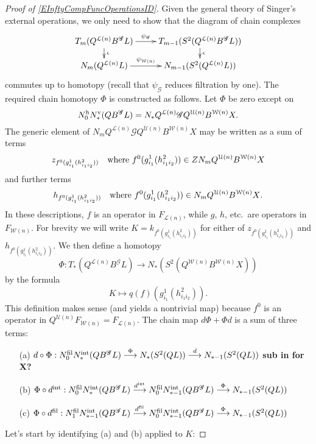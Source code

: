\documentclass[11pt]{amsart}
\theoremstyle{plain}
\theoremstyle{definition}
\renewcommand{\to}{\longrightarrow}
\newcommand{\squishlist}{
  \setlength{\itemsep}{.5pt}
  \setlength{\parskip}{0pt}
  \setlength{\parsep}{0pt}}
\newcommand{\scrG}{\mathscr{G}}
\newcommand{\calW}{\mathcal{W}}
\newcommand{\calU}{\mathcal{U}}
\newcommand{\calL}{\mathcal{L}}
\theoremstyle{plain}
\newcommand{\BSW}{{\scrG}}
\newcommand{\BSWres}{B^\BSW}%
\begin{document}
\begin{Composite functor spectral sequences}
\begin{tricky proofs of operation compatibilities}
\begin{proof}[Proof of \ref{EInftyCompFuncOperationsID}]
Given the general theory of Singer's external operations, we only need to show that the diagram of chain complexes
\[\xymatrix@R=4mm{
T_{m}(Q^{\calL(n)}\BSWres L)
\ar[r]^-{\psi_{\BSW}}
\ar[d]^-{\epsilon}
&%
T_{m-1}(S^2(Q^{\calL(n)}\BSWres L))\ar[d]^-{\epsilon}
\\%
N_{m}(Q^{\calL(n)}L)
\ar[r]^-{\psi_{\calW(n)}}
&%
N_{m-1}(S^2(Q^{\calL(n)} L))
}\]
commutes up to homotopy (recall that $\psi_{\BSW}$ reduces filtration by one). The required chain homotopy $\Phi$ is constructed as follows. Let $\Phi$ be zero except on 
\[N_0^\textup{h}N_*^\textup{v}(Q\BSWres L)=N_*Q^{\calL(n)}\BSW Q^{\calU(n)}B^{\calW(n)}X.\]
The generic element of $N_mQ^{\calL(n)}\BSW Q^{\calU(n)}B^{\calW(n)}X$ may be written as a sum of terms
\[z_{f^0(g^1_{i_1}(h^2_{i_1i_2}))}\textup{\quad where $f^0(g^1_{i_1}(h^2_{i_1i_2}))\in ZN_m Q^{\calU(n)}B^{\calW(n)}X$}\]
and further terms
\[h_{f^0(g^1_{i_1}(h^2_{i_1i_2}))}\textup{\quad where $f^0(g^1_{i_1}(h^2_{i_1i_2}))\in N_{m} Q^{\calU(n)}B^{\calW(n)}X$}.\]
In these descriptions, $f$ is an operator in $F_{\calL(n)}$, while $g$, $h$, etc.\ are operators in $F_{\calW(n)}$.
For brevity we will write $K=k_{f^0(g^1_{i_1}(h^2_{i_1i_2}))}$ for either of $z_{f^0(g^1_{i_1}(h^2_{i_1i_2}))}$ and $h_{f^0(g^1_{i_1}(h^2_{i_1i_2}))}$.
We then define a homotopy 
\[\Phi:T_*(Q^{\calL(n)}\BSWres L)\to N_*(S^2(Q^{\calW(n)}B^{\calW(n)}X))\]
by the formula
\[K\mapsto q(f)(g^1_{i_1}(h^2_{i_1i_2})).\]
This definition makes sense (and yields a nontrivial map) because $f^0$ is an operator in $Q^{\calU(n)}F_{\calW(n)}=F_{\calL(n)}$.
The chain map $d\Phi+\Phi d$ is a sum of three terms:
\begin{enumerate}\squishlist
\setlength{\parindent}{.25in}
\item[(a)] $d\circ\Phi:N_0^\textup{fil}N_*^\textup{int}(Q\BSWres L)\overset{\Phi}{\to} N_*(S^2(QL))\overset{d}{\to} N_{*-1}(S^2(QL))$ \textbf{sub in for X?}
\item[(b)] $\Phi\circ d^\textup{int}:N_0^\textup{fil}N_{*}^\textup{int}(Q\BSWres L)\overset{d^\textup{int}}{\to} N_0^\textup{fil}N_{*-1}^\textup{int}(Q\BSWres L)\overset{\Phi}{\to} N_{*-1}(S^2(QL))$
\item[(c)] $\Phi\circ d^\textup{fil}:N_1^\textup{fil}N_{*-1}^\textup{int}(Q\BSWres L)\overset{d^\textup{fil}}{\to} N_0^\textup{fil}N_{*-1}^\textup{int}(Q\BSWres L)\overset{\Phi}{\to} N_{*-1}(S^2(QL))$
\end{enumerate}
Let's start by identifying (a) and (b) applied to $K$:

\end{proof}
\end{tricky proofs of operation compatibilities}
\end{Composite functor spectral sequences}
\end{document}

